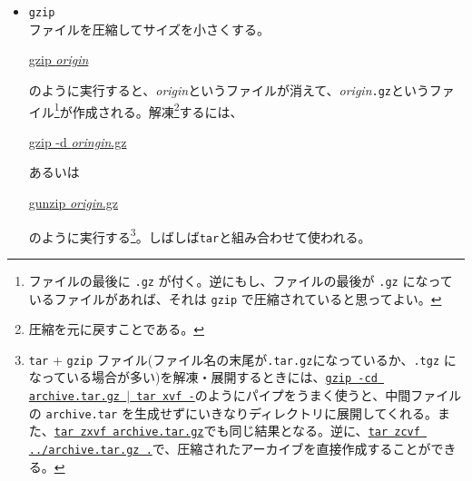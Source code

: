\begin{itemize}
          ファイルをまとめて一つにまとめる。\textbf{t}ape \textbf{ar}chiverの略である。ファイルを転送したり、バックアップを取るときに利用する。
          \begin{commandline2}
              \prompt \underline{tar cvf ../archive.tar .}
          \end{commandline2} \noindent
          のように使うと、\texttt{../archive.tar} というファイル\footnote{ファイル名の最後に \texttt{.tar} を付ける習慣にしておくと、あとで混乱が少なくなる。}にカレントディレクトリ以下のすべてのファイルのバックアップが取られる。\texttt{.} の代わりに \texttt{\(\ast\).c} を使えば カレントディレクトリの \texttt{.c} で終るファイルがまとめられる。また、\texttt{.} の部分にディレクトリを指定すれば、そのディレクトリ以下のファイルすべてのバックアップを取ることができる。反対に展開するときは、
          \begin{commandline2}
              \prompt \underline{tar xvf archive.tar}
          \end{commandline2} \noindent
          のようにする。
    \item \texttt{gzip}\\
          ファイルを圧縮してサイズを小さくする。
          \begin{commandline2}
              \prompt \underline{gzip \textit{origin}}
          \end{commandline2} \noindent
          のように実行すると、\textit{origin}というファイルが消えて、\textit{origin}\texttt{.gz}というファイル\footnote{ファイルの最後に \texttt{.gz} が付く。逆にもし、ファイルの最後が \texttt{.gz} になっているファイルがあれば、それは \texttt{gzip} で圧縮されていると思ってよい。}が作成される。解凍\footnote{圧縮を元に戻すことである。}するには、
          \begin{commandline2}
              \prompt \underline{gzip -d \textit{oringin}.gz}
          \end{commandline2} \noindent
          あるいは
          \begin{commandline2}
              \prompt \underline{gunzip \textit{origin}.gz}
          \end{commandline2} \noindent
          のように実行する\footnote{\texttt{tar} + \texttt{gzip} ファイル(ファイル名の末尾が\texttt{.tar.gz}になっているか、\texttt{.tgz} になっている場合が多い)を解凍・展開するときには、\texttt{\underline{gzip -cd archive.tar.gz \(|\) tar xvf -}}のようにパイプをうまく使うと、中間ファイルの \texttt{archive.tar} を生成せずにいきなりディレクトリに展開してくれる。また、\underline{\texttt{tar zxvf archive.tar.gz}}でも同じ結果となる。逆に、\underline{\texttt{tar zcvf ../archive.tar.gz .}}で、圧縮されたアーカイブを直接作成することができる。}。しばしば\texttt{tar}と組み合わせて使われる。


\end{itemize}
